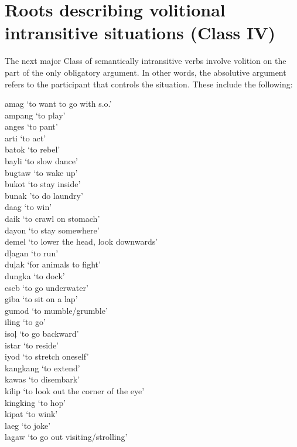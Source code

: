 \section{Roots describing volitional intransitive situations (Class IV)}
\label{bkm:Ref149230430}

The next major Class of semantically intransitive verbs involve volition on the part of the only obligatory argument. In other words, the absolutive argument refers to the participant that controls the situation. These include the following:
\ea
\label{bkm:Ref120784669}
\begin{multicols}{2}
amag ‘to want to go with s.o.’\\
ampang ‘to play’\\
anges ‘to pant’\\
arti ‘to act’\\
batok ‘to rebel’\\
bayli ‘to slow dance’\\
bugtaw ‘to wake up’\\
bukot ‘to stay inside’\\
bunak 'to do laundry' \\
daag ‘to win’\\
daik ‘to crawl on stomach’\\
dayon ‘to stay somewhere’\\
demel ‘to lower the head, look downwards’ \\
dļagan ‘to run’\\
duļak ‘for animals to fight’\\
dungka ‘to dock’\\
eseb ‘to go underwater’\\
giba ‘to sit on a lap’\\
gumod ‘to mumble/grumble’\\
iling ‘to go’\\
isoļ ‘to go backward’\\
istar ‘to reside’\\
iyod ‘to stretch oneself’\\
kangkang ‘to extend’\\
kawas ‘to disembark’\\
kilip ‘to look out the corner  of the   eye’\\
kingking ‘to hop’\\
kipat ‘to wink’\\
laeg ‘to joke’\\
lagaw ‘to go out visiting/strolling’\\

\end{multicols}
